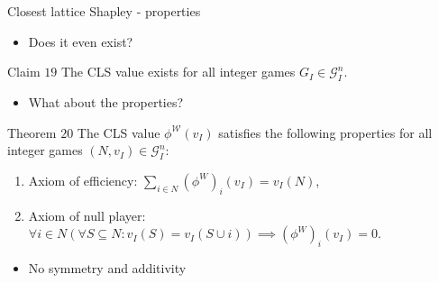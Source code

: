 \documentclass{beamer}
\begin{document}


\begin{frame}{Closest lattice Shapley - properties}
    \pause

    \begin{itemize}
        \item Does it even exist?
    \end{itemize}

    \pause

    \begin{block}{Claim $19$}
        The CLS value exists for all integer games $G_I \in \mathcal{G}_I^n$.
    \end{block}

    \pause

    \begin{itemize}
        \item What about the properties?
    \end{itemize}

    \pause

    \begin{block}{Theorem $20$}
        The CLS value $\phi^\mathcal{W}(v_I)$ satisfies the following properties for all integer games $(N,v_I) \in \mathcal{G}_I^n$:
        
        \begin{enumerate}
            \item Axiom of efficiency: $\sum_{i \in N}(\phi^W)_{i}(v_I) = v_I(N)$,
            \item Axiom of null player: $\forall i \in N(\forall S \subseteq N: v_I(S)=v_I(S \cup i)) \implies (\phi^W)_{i}(v_I) = 0$.
        \end{enumerate}
    \end{block}

    \pause

    \begin{itemize}
        \item No symmetry and additivity
    \end{itemize}
\end{frame}


\end{document}
